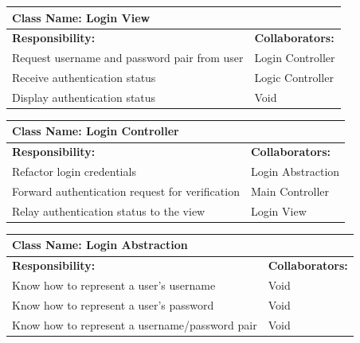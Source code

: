 \documentclass[]{article}
\begin{document}
	\begin{table}[H]
	\centering
		\begin{tabular}{|p{9cm}|p{3cm}|}
		\hline
		 \multicolumn{2}{|l|}{\textbf{Class Name: Login View}} \\
		\hline
		\textbf{Responsibility:} & \textbf{Collaborators:} \\
		\hline
		Request username and password pair from user & Login Controller\\
		\hline
		Receive authentication status & Logic Controller\\
		\hline
		Display authentication status & Void\\
		\hline
		\end{tabular}
	\end{table}
	
	\begin{table}[H]
	\centering
		\begin{tabular}{|p{9cm}|p{3cm}|}
		\hline
		 \multicolumn{2}{|l|}{\textbf{Class Name: Login Controller}} \\
		\hline
		\textbf{Responsibility:} & \textbf{Collaborators:} \\
		\hline
	    Refactor login credentials & Login Abstraction\\
		\hline
		Forward authentication request for verification & Main Controller\\
		\hline
		Relay authentication status to the view & Login View\\
		\hline
		\end{tabular}
	\end{table}
	
	\begin{table}[H]
	\centering
		\begin{tabular}{|p{9cm}|p{3cm}|}
		\hline
		 \multicolumn{2}{|l|}{\textbf{Class Name: Login Abstraction}} \\
		\hline
		\textbf{Responsibility:} & \textbf{Collaborators:} \\
		\hline
	    Know how to represent a user's username & Void\\
		\hline
		Know how to represent a user's password & Void\\
		\hline
		Know how to represent a username/password pair & Void\\
		\hline
		\end{tabular}
	\end{table}
	
\end{document}
